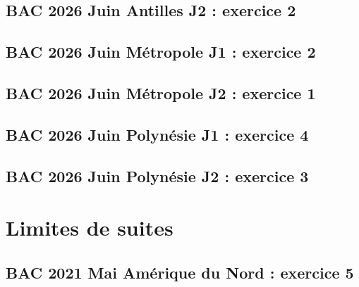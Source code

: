 \documentclass[lang=fr,edition=teacher,layout=sheet]{mxbook}
\begin{document}
\begingroup\endgroup
\par\bigskip
{}\subsection*{BAC 2026 Juin Antilles J2 : exercice 2}
\begingroup\endgroup
\par\bigskip
{}\subsection*{BAC 2026 Juin Métropole J1 : exercice 2}
\begingroup\endgroup
\par\bigskip
{}\subsection*{BAC 2026 Juin Métropole J2 : exercice 1}
\begingroup\endgroup
\par\bigskip
{}\subsection*{BAC 2026 Juin Polynésie J1 : exercice 4}
\begingroup\endgroup
\par\bigskip
{}\subsection*{BAC 2026 Juin Polynésie J2 : exercice 3}
\begingroup\endgroup
\par\bigskip
\clearpage\section*{Limites de suites}
\subsection*{BAC 2021 Mai Amérique du Nord : exercice 5}
\begingroup\endgroup
\end{document}
